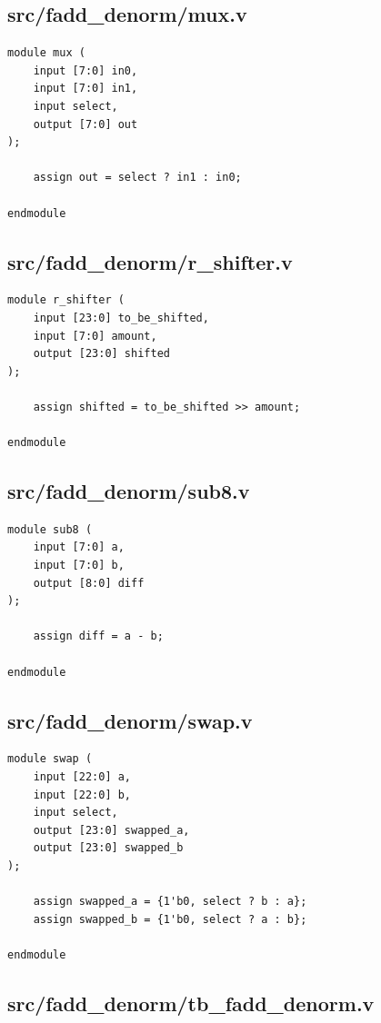 \documentclass{article}
\begin{document}
\subsection{src/fadd\_denorm/mux.v}

\begin{lstlisting}
module mux (
    input [7:0] in0,
    input [7:0] in1,
    input select,
    output [7:0] out
);

    assign out = select ? in1 : in0;

endmodule
\end{lstlisting}

\subsection{src/fadd\_denorm/r\_shifter.v}

\begin{lstlisting}
module r_shifter (
    input [23:0] to_be_shifted,
    input [7:0] amount,
    output [23:0] shifted
);

    assign shifted = to_be_shifted >> amount;

endmodule
\end{lstlisting}

\subsection{src/fadd\_denorm/sub8.v}

\begin{lstlisting}
module sub8 (
    input [7:0] a,
    input [7:0] b,
    output [8:0] diff
);

    assign diff = a - b;

endmodule
\end{lstlisting}

\subsection{src/fadd\_denorm/swap.v}

\begin{lstlisting}
module swap (
    input [22:0] a,
    input [22:0] b,
    input select,
    output [23:0] swapped_a,
    output [23:0] swapped_b
);

    assign swapped_a = {1'b0, select ? b : a};
    assign swapped_b = {1'b0, select ? a : b};

endmodule
\end{lstlisting}

\subsection{src/fadd\_denorm/tb\_fadd\_denorm.v}
\end{document}
